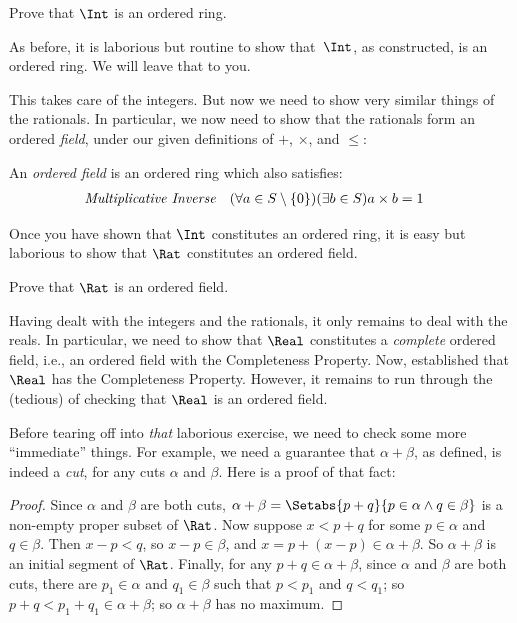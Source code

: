 \begin{prob}
Prove that $\Int$ is an ordered ring. 
\end{prob}

As before, it is laborious but routine to show that~$\Int$, as
constructed, is an ordered ring. We will leave that to you.

This takes care of the integers. But now we need to show very similar
things of the rationals. In particular, we now need to show that the
rationals form an ordered \emph{field}, under our given definitions of
$+$, $\times$, and $\leq$:
\begin{defn}
An \emph{ordered field} is an ordered ring which also satisfies:
\begin{align*}
	\emph{Multiplicative Inverse}& & (\forall a \in S \setminus \{0\})(\exists b \in S) a\times b& = 1
\end{align*}
\end{defn}

Once you have shown that $\Int$ constitutes an ordered ring, it is
easy but laborious to show that $\Rat$ constitutes an ordered field.

\begin{prob}
Prove that $\Rat$ is an ordered field.
\end{prob}

Having dealt with the integers and the rationals, it only remains to
deal with the reals. In particular, we need to show that $\Real$
constitutes a \emph{complete} ordered field, i.e., an ordered field
with the Completeness Property. Now, 
established that $\Real$ has the Completeness Property. However, it
remains to run through the (tedious) of checking that $\Real$ is an
ordered field. 

Before tearing off into \emph{that} laborious exercise, we need to
check some more ``immediate'' things. For example, we need a guarantee
that $\alpha + \beta$, as defined, is indeed a \emph{cut}, for any
cuts $\alpha$ and $\beta$. Here is a proof of that fact:

\begin{proof}	
Since $\alpha$ and $\beta$ are both cuts, $\alpha + \beta = \Setabs{p
+ q}{p \in \alpha \land q \in \beta}$ is a non-empty proper subset of
$\Rat$. Now suppose $x < p + q$ for some $p \in \alpha$ and $q \in \beta$.
Then $x - p < q$, so $x - p \in \beta$, and $x = p + (x - p) \in
\alpha + \beta$. So $\alpha + \beta$ is an initial segment of $\Rat$.
Finally, for any $p + q \in \alpha + \beta$, since $\alpha$ and
$\beta$ are both cuts, there are $p_1 \in \alpha$ and $q_1 \in \beta$
such that $p < p_1$ and $q < q_1$; so $p + q < p_1 + q_1 \in \alpha +
\beta$; so $\alpha + \beta$ has no maximum. 
\end{proof}

